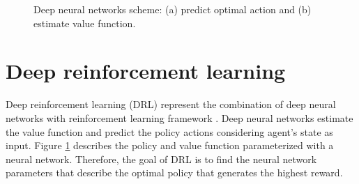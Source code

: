\begin{figure}[h!]
	\centering
	\hfill
	\caption{Deep neural networks scheme: (a) predict optimal action and (b) estimate value function.}
	\label{fig:rl_cnn}
\end{figure}

\section{Deep reinforcement learning}
Deep reinforcement learning (DRL) represent the combination of deep neural networks with reinforcement learning framework \cite{li2017deep}. Deep neural networks estimate the value function and predict the policy actions considering agent's state as input. Figure \ref{fig:rl_cnn} describes the policy and value function parameterized with a neural network. Therefore, the goal of DRL is to find the neural network parameters that describe the optimal policy that generates the highest reward.

